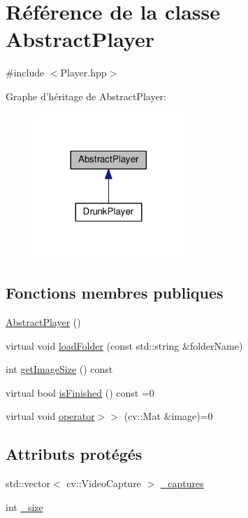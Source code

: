 \hypertarget{classAbstractPlayer}{\section{Référence de la classe Abstract\+Player}
\label{classAbstractPlayer}
}


{\ttfamily \#include $<$Player.\+hpp$>$}



Graphe d'héritage de Abstract\+Player\+:\nopagebreak
\begin{figure}[H]
\begin{center}
\leavevmode
\includegraphics[width=161pt]{classAbstractPlayer__inherit__graph}
\end{center}
\end{figure}
\subsection*{Fonctions membres publiques}
\begin{DoxyCompactItemize}
\item 
\hyperlink{classAbstractPlayer_a4987602a4b3381a9c592585dde7cf33b}{Abstract\+Player} ()
\item 
virtual void \hyperlink{classAbstractPlayer_a2091b1757bfd13116dfa4612af55473b}{load\+Folder} (const std\+::string \&folder\+Name)
\item 
int \hyperlink{classAbstractPlayer_a8bdc017fb32c90e6635ed6b7491fbe98}{get\+Image\+Size} () const 
\item 
virtual bool \hyperlink{classAbstractPlayer_a841896a599ebe6b8317905de78c44bcc}{is\+Finished} () const =0
\item 
virtual void \hyperlink{classAbstractPlayer_a5c9a863c96224dd297aa44c69010cd94}{operator$>$$>$} (cv\+::\+Mat \&image)=0
\end{DoxyCompactItemize}
\subsection*{Attributs protégés}
\begin{DoxyCompactItemize}
\item 
std\+::vector$<$ cv\+::\+Video\+Capture $>$ \hyperlink{classAbstractPlayer_a72dd2ef25310decd45671a7d51e1f319}{\+\_\+captures}
\item 
int \hyperlink{classAbstractPlayer_a9d8395a141cc985622d4910209bc7d53}{\+\_\+size}
\end{DoxyCompactItemize}


